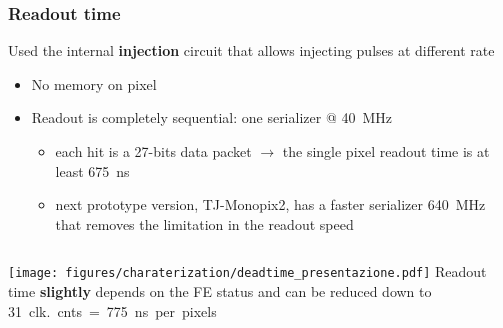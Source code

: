     \begin{frame}
        \frametitle{Readout time}
        Used the internal \textbf{injection} circuit that allows injecting pulses at different rate 
        \begin{itemize}
            \item No memory on pixel
            \item Readout is completely sequential: one serializer @ \SI{40}{MHz}
            \begin{itemize}
                \item each hit is a 27-bits data packet $\rightarrow$ the single pixel readout time is at least \SI{675}{ns} 
                \item next prototype version, TJ-Monopix2, has a faster serializer \SI{640}{MHz} that removes the limitation in the readout speed 
            \end{itemize}
        \end{itemize}

        \medskip
        \begin{columns}
                \texttt{[image: figures/charaterization/deadtime\_presentazione.pdf]}
            Readout time \textbf{slightly} depends on the FE status and can be reduced down to \SI{31}{clk.}cnts = \SI{775}{ns} per pixels 

        \end{columns}            
    \end{frame}          